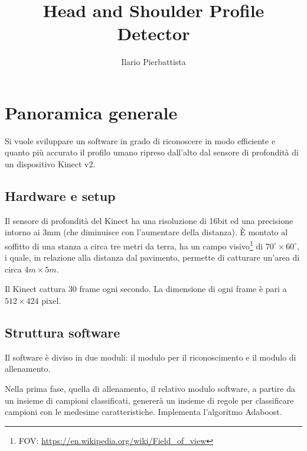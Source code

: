 \documentclass[a4paper,11pt,oneside]{article}
\begin{document}

	\title{Head and Shoulder Profile Detector}
	\author{Ilario Pierbattista}
	\maketitle

	\section{Panoramica generale} %
	\label{sec:panoramica_generale}
		Si vuole sviluppare un software in grado di riconoscere in modo efficiente e quanto più accurato il profilo umano ripreso dall'alto dal sensore di profondità di un dispositivo Kinect v2.

		\subsection{Hardware e setup} %
		\label{sub:hardware_e_setup}
			Il sensore di profondità del Kinect ha una risoluzione di 16bit ed una precisione intorno ai 3mm (che diminuisce con l'aumentare della distanza). È montato al soffitto di una stanza a circa tre metri da terra, ha un campo visivo\footnote{FOV: \url{https://en.wikipedia.org/wiki/Field_of_view}} di $70^{\circ} \times 60^{\circ}$, i quale, in relazione alla distanza dal pavimento, permette di catturare un'area di circa $4m \times 5m$.

			Il Kinect cattura 30 frame ogni secondo. La dimensione di ogni frame è pari a $512 \times 424$ pixel.

		\subsection{Struttura software} %
		\label{sub:struttura_software}
			Il software è diviso in due moduli: il modulo per il riconoscimento e il modulo di allenamento.

			Nella prima fase, quella di allenamento, il relativo modulo software, a partire da un insieme di campioni classificati, genererà un insieme di regole per classificare campioni con le medesime caratteristiche. Implementa l'algoritmo Adaboost.
\end{document}

